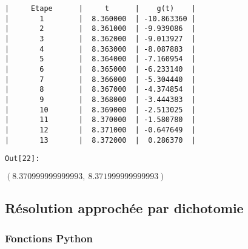 \documentclass[11pt]{article}
\begin{document}
    \begin{Verbatim}[commandchars=\\\{\}]
|     Etape      |     t      |    g(t)    |
|       1        |  8.360000  | -10.863360 |
|       2        |  8.361000  | -9.939086  |
|       3        |  8.362000  | -9.013927  |
|       4        |  8.363000  | -8.087883  |
|       5        |  8.364000  | -7.160954  |
|       6        |  8.365000  | -6.233140  |
|       7        |  8.366000  | -5.304440  |
|       8        |  8.367000  | -4.374854  |
|       9        |  8.368000  | -3.444383  |
|       10       |  8.369000  | -2.513025  |
|       11       |  8.370000  | -1.580780  |
|       12       |  8.371000  | -0.647649  |
|       13       |  8.372000  |  0.286370  |

    \end{Verbatim}
\texttt{\color{outcolor}Out[{\color{outcolor}22}]:}
    
    $\displaystyle \left( 8.370999999999993, \  8.371999999999993\right)$

    

    \subsection{Résolution approchée par
dichotomie}\label{ruxe9solution-approchuxe9e-par-dichotomie}

    \subsubsection{Fonctions Python}\label{fonctions-python}
\end{document}
